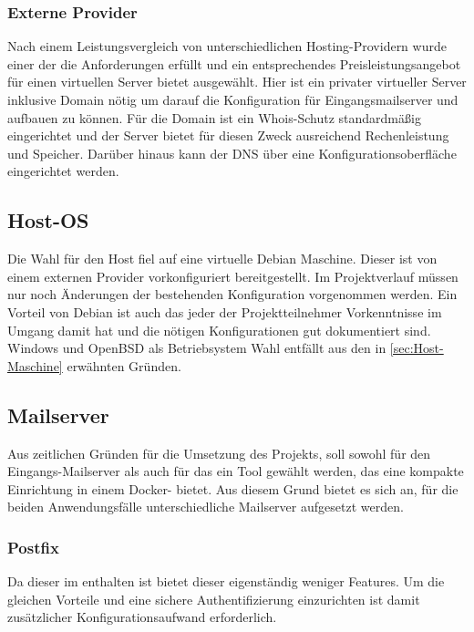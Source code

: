 \documentclass[a4paper,11pt,singlespacing]{article}
\begin{document}
		\subsubsection{Externe Provider}\label{sec:AuswahlLösungExterneProvider}
			Nach einem Leistungsvergleich von unterschiedlichen Hosting-Providern wurde einer der die Anforderungen erfüllt und ein entsprechendes Preisleistungsangebot für einen virtuellen Server bietet ausgewählt.
			Hier ist ein privater virtueller Server inklusive Domain nötig um darauf die Konfiguration für Eingangsmailserver und  aufbauen zu können.
			Für die Domain ist ein Whois-Schutz standardmä{\ss}ig eingerichtet und der Server bietet für diesen Zweck ausreichend Rechenleistung und Speicher. Darüber hinaus kann der DNS über eine Konfigurationsoberfläche eingerichtet werden.		

	\subsection{Host-OS}\label{sec:AuswahlLösungHost-Maschine}
			Die Wahl für den Host fiel auf eine virtuelle Debian Maschine.
			Dieser ist von einem externen Provider vorkonfiguriert  bereitgestellt. Im Projektverlauf müssen nur noch Änderungen der bestehenden Konfiguration vorgenommen werden. Ein Vorteil von Debian ist auch das jeder der Projektteilnehmer Vorkenntnisse im Umgang damit hat und die nötigen Konfigurationen gut dokumentiert sind.
Windows und OpenBSD als Betriebsystem Wahl entfällt aus den in \autoref{sec:Host-Maschine} erwähnten Gründen.

	\subsection{Mailserver}\label{sec:AuswahlLösungMailserver}
		Aus zeitlichen Gründen für die Umsetzung des Projekts, soll sowohl für den Eingangs-Mailserver als auch für das  ein Tool gewählt werden, das eine kompakte Einrichtung in einem Docker-	bietet. Aus diesem Grund bietet es sich an, für die beiden Anwendungsfälle unterschiedliche Mailserver aufgesetzt werden.
		
		\subsubsection{Postfix}\label{sec:AuswahlLösungPostfix}	
			Da dieser im  enthalten ist bietet dieser eigenständig weniger Features. Um die gleichen Vorteile und eine sichere Authentifizierung einzurichten ist damit zusätzlicher Konfigurationsaufwand erforderlich.
			
\end{document}
